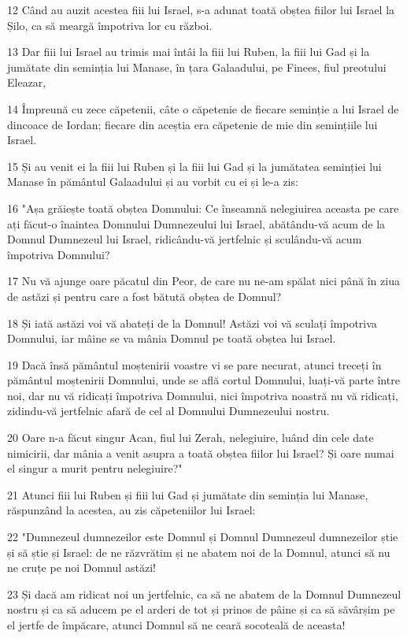 \par 12 Când au auzit acestea fiii lui Israel, s-a adunat toată obștea fiilor lui Israel la Șilo, ca să meargă împotriva lor cu război.
\par 13 Dar fiii lui Israel au trimis mai întâi la fiii lui Ruben, la fiii lui Gad și la jumătate din seminția lui Manase, în țara Galaadului, pe Finees, fiul preotului Eleazar,
\par 14 Împreună cu zece căpetenii, câte o căpetenie de fiecare seminție a lui Israel de dincoace de Iordan; fiecare din aceștia era căpetenie de mie din semințiile lui Israel.
\par 15 Și au venit ei la fiii lui Ruben și la fiii lui Gad și la jumătatea seminției lui Manase în pământul Galaadului și au vorbit cu ei și le-a zis:
\par 16 "Așa grăiește toată obștea Domnului: Ce înseamnă nelegiuirea aceasta pe care ați făcut-o înaintea Domnului Dumnezeului lui Israel, abătându-vă acum de la Domnul Dumnezeul lui Israel, ridicându-vă jertfelnic și sculându-vă acum împotriva Domnului?
\par 17 Nu vă ajunge oare păcatul din Peor, de care nu ne-am spălat nici până în ziua de astăzi și pentru care a fost bătută obștea de Domnul?
\par 18 Și iată astăzi voi vă abateți de la Domnul! Astăzi voi vă sculați împotriva Domnului, iar mâine se va mânia Domnul pe toată obștea lui Israel.
\par 19 Dacă însă pământul moștenirii voastre vi se pare necurat, atunci treceți în pământul moștenirii Domnului, unde se află cortul Domnului, luați-vă parte între noi, dar nu vă ridicați împotriva Domnului, nici împotriva noastră nu vă ridicați, zidindu-vă jertfelnic afară de cel al Domnului Dumnezeului nostru.
\par 20 Oare n-a făcut singur Acan, fiul lui Zerah, nelegiuire, luând din cele date nimicirii, dar mânia a venit asupra a toată obștea fiilor lui Israel? Și oare numai el singur a murit pentru nelegiuire?"
\par 21 Atunci fiii lui Ruben și fiii lui Gad și jumătate din seminția lui Manase, răspunzând la acestea, au zis căpeteniilor lui Israel:
\par 22 "Dumnezeul dumnezeilor este Domnul și Domnul Dumnezeul dumnezeilor știe și să știe și Israel: de ne răzvrătim și ne abatem noi de la Domnul, atunci să nu ne cruțe pe noi Domnul astăzi!
\par 23 Și dacă am ridicat noi un jertfelnic, ca să ne abatem de la Domnul Dumnezeul nostru și ca să aducem pe el arderi de tot și prinos de pâine și ca să săvârșim pe el jertfe de împăcare, atunci Domnul să ne ceară socoteală de aceasta!
